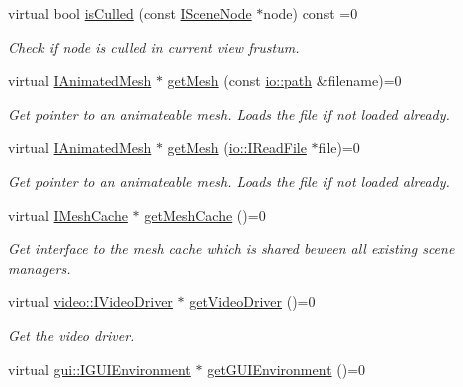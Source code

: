 \begin{DoxyCompactItemize}
virtual bool \hyperlink{classirr_1_1scene_1_1ISceneManager_aff6c6d553e0faf12bbfd33e814ad4352}{is\+Culled} (const \hyperlink{classirr_1_1scene_1_1ISceneNode}{I\+Scene\+Node} $\ast$node) const =0
\begin{DoxyCompactList}\small\item\em Check if node is culled in current view frustum. \end{DoxyCompactList}\item 
virtual \hyperlink{classirr_1_1scene_1_1IAnimatedMesh}{I\+Animated\+Mesh} $\ast$ \hyperlink{classirr_1_1scene_1_1ISceneManager_a63894c3f3d46cfc385116f1705935e03}{get\+Mesh} (const \hyperlink{namespaceirr_1_1io_a6468281622ce3a1c46b72e19f32dded5}{io\+::path} \&filename)=0
\begin{DoxyCompactList}\small\item\em Get pointer to an animateable mesh. Loads the file if not loaded already. \end{DoxyCompactList}\item 
virtual \hyperlink{classirr_1_1scene_1_1IAnimatedMesh}{I\+Animated\+Mesh} $\ast$ \hyperlink{classirr_1_1scene_1_1ISceneManager_af0ff82d7bac969d6a30f67c7b1fa0c46}{get\+Mesh} (\hyperlink{classirr_1_1io_1_1IReadFile}{io\+::\+I\+Read\+File} $\ast$file)=0
\begin{DoxyCompactList}\small\item\em Get pointer to an animateable mesh. Loads the file if not loaded already. \end{DoxyCompactList}\item 
virtual \hyperlink{classirr_1_1scene_1_1IMeshCache}{I\+Mesh\+Cache} $\ast$ \hyperlink{classirr_1_1scene_1_1ISceneManager_a45d89c816e33abe0e77eb063d7ce58a8}{get\+Mesh\+Cache} ()=0
\begin{DoxyCompactList}\small\item\em Get interface to the mesh cache which is shared beween all existing scene managers. \end{DoxyCompactList}\item 
virtual \hyperlink{classirr_1_1video_1_1IVideoDriver}{video\+::\+I\+Video\+Driver} $\ast$ \hyperlink{classirr_1_1scene_1_1ISceneManager_afde082160205a8faab44cd5b61e3745c}{get\+Video\+Driver} ()=0
\begin{DoxyCompactList}\small\item\em Get the video driver. \end{DoxyCompactList}\item 
virtual \hyperlink{classirr_1_1gui_1_1IGUIEnvironment}{gui\+::\+I\+G\+U\+I\+Environment} $\ast$ \hyperlink{classirr_1_1scene_1_1ISceneManager_ad887536e9cc41d0670364f9f0a0f4510}{get\+G\+U\+I\+Environment} ()=0

\end{DoxyCompactItemize}
